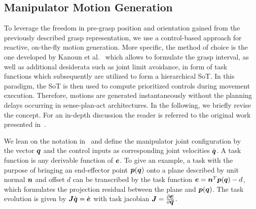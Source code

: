 \subsection{Manipulator Motion Generation}
\label{subsec:manip_motion}
%
To leverage the freedom in pre-grasp position and orientation gained from the previously described
grasp representation, we use a control-based approach for reactive, on-the-fly motion
generation. More specific, the method of choice is the one developed by Kanoun et al.~\cite{Kano11}
which allows to formulate the grasp interval, as well as additional desiderata such as joint limit
avoidance, in form of task functions which subsequently are utilized to form a hierarchical SoT. In
this paradigm, the SoT is then used to compute prioritized controls during movement
execution. Therefore, motions are generated instantaneously without the planning delays occurring in
sense-plan-act architectures. In the following, we briefly revise the concept. For an in-depth
discussion the reader is referred to the original work presented in~\cite{Kano11}.

We lean on the notation in~\cite{Esca14} and define the manipulator joint configuration by the
vector $\mbox{\boldmath $q$}$ and the control inputs as corresponding joint velocities $\dot{\mbox{\boldmath $q$}}$. A task
function is any derivable function of $\mbox{\boldmath $e$}$. To give an example, a task with the purpose of
bringing an end-effector point $\mbox{\boldmath $p$}(\mbox{\boldmath $q$})$ onto a plane described by unit normal $\mbox{\boldmath $n$}$
and offset $d$ can be transcribed by the task function $\mbox{\boldmath $e$}=\mbox{\boldmath $n$}^T\mbox{\boldmath $p$}(\mbox{\boldmath $q$})-d$, which
formulates the projection residual between the plane and $\mbox{\boldmath $p$}(\mbox{\boldmath $q$})$. The task evolution is
given by $\mbox{\boldmath $J$}\dot{\mbox{\boldmath $q$}}=\dot{\mbox{\boldmath $e$}}$ with task jacobian
$\mbox{\boldmath $J$}=\frac{\partial\mbox{\boldmath $e$}}{\partial\mbox{\boldmath $q$}}$.

